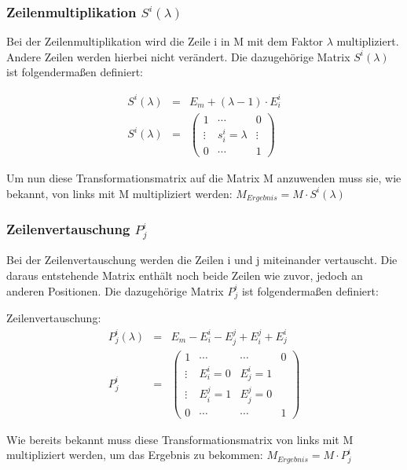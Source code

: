 \subsubsection{Zeilenmultiplikation $S^i(\lambda)$}
Bei der Zeilenmultiplikation wird die Zeile i in M mit dem Faktor $\lambda$ multipliziert. Andere Zeilen werden hierbei nicht verändert. Die dazugehörige Matrix $S^i(\lambda)$ ist folgendermaßen definiert:
\begin{Def}
\begin{eqnarray}
	S^i(\lambda) &=& E_m + (\lambda - 1) \cdot E^i_i \\
	S^i(\lambda) &=& 
	\begin{pmatrix}
	1 & \cdots & 0 \\ 
	\vdots & s^i_i = \lambda & \vdots \\ 
	0 & \cdots & 1
	\end{pmatrix} 
\end{eqnarray}
\end{Def}
\raggedright Um nun diese Transformationsmatrix auf die Matrix M anzuwenden muss sie, wie bekannt, von links mit M multipliziert werden: $M_{Ergebnis} = M \cdot S^i(\lambda)$

\subsubsection{Zeilenvertauschung $P^i_j$}
Bei der Zeilenvertauschung werden die Zeilen i und j miteinander vertauscht. Die daraus entstehende Matrix enthält noch beide Zeilen wie zuvor, jedoch an anderen Positionen. Die dazugehörige Matrix $P^i_j$ ist folgendermaßen definiert:
\begin{Def} Zeilenvertauschung:
\begin{eqnarray}
	P_j^i(\lambda) &=& E_m - E^i_i - E^j_j + E^j_i + E^i_j \\
	P^i_j &=& 
	\begin{pmatrix}
	1 & \cdots & \cdots & 0 \\ 
	\vdots & E^i_i = 0 & E^i_j = 1 &  \\ 
	\vdots & E^j_i = 1 & E^j_j = 0 &  \\ 
	0 & \cdots & \cdots & 1
	\end{pmatrix} 
\end{eqnarray}
\end{Def}
\raggedright Wie bereits bekannt muss diese Transformationsmatrix von links mit M multipliziert werden, um das Ergebnis zu bekommen: $M_{Ergebnis} = M \cdot P^i_j$